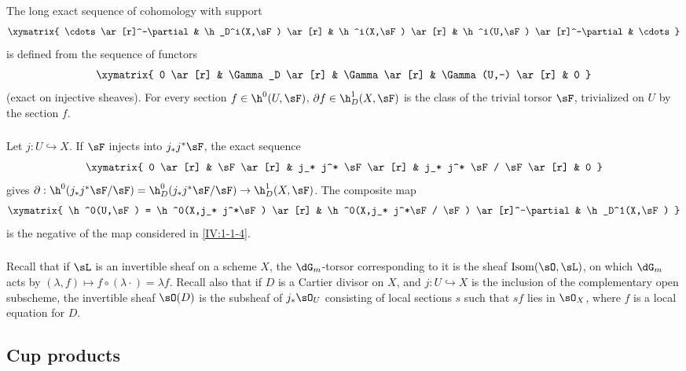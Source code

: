\documentclass[oneside]{book}
\begin{document}
The long exact sequence of cohomology with support
\[\xymatrix{
  \cdots \ar[r]^-\partial
    & \h_D^i(X,\sF) \ar[r]
    & \h^i(X,\sF) \ar[r]
    & \h^i(U,\sF) \ar[r]^-\partial
    & \cdots
}\]
is defined from the sequence of functors
\[\xymatrix{
  0 \ar[r]
    & \Gamma_D \ar[r]
    & \Gamma \ar[r]
    & \Gamma(U,-) \ar[r]
    & 0
}\]
(exact on injective sheaves). For every section $f\in \h^0(U,\sF)$,
$\partial f\in \h_D^1(X,\sF)$ is the class of the trivial torsor $\sF$,
trivialized on $U$ by the section $f$.






\subsubsection{}\label{IV:1-1-5}

Let $j:U\hookrightarrow X$. If $\sF$ injects into $j_* j^* \sF$, the exact
sequence
\[\xymatrix{
  0 \ar[r]
  & \sF \ar[r]
  & j_* j^* \sF \ar[r]
  & j_* j^* \sF / \sF \ar[r]
  & 0
}\]
gives
$\partial:\h^0(j_* j^*\sF/\sF) = \h_D^0(j_* j^* \sF/\sF) \to \h_D^1(X,\sF)$.
The composite map
\[\xymatrix{
  \h^0(U,\sF) = \h^0(X,j_* j^*\sF) \ar[r]
    & \h^0(X,j_* j^*\sF / \sF) \ar[r]^-\partial
    & \h_D^1(X,\sF)
}\]
is the negative of the map considered in \ref{IV:1-1-4}.






\subsubsection{}\label{IV:1-1-6}

Recall that if $\sL$ is an invertible sheaf on a scheme $X$, the
$\dG_m$-torsor corresponding to it is the sheaf
$\operatorname{Isom}(\sO,\sL)$, on which $\dG_m$ acts by
$(\lambda,f)\mapsto f\circ (\lambda\cdot) = \lambda f$. Recall also that if
$D$ is a Cartier divisor on $X$, and $j:U\hookrightarrow X$ is the inclusion
of the complementary open subscheme, the invertible sheaf $\sO(D)$ is the
subsheaf of $j_*\sO_U$ consisting of local sections $s$ such that $s f$ lies
in $\sO_X$, where $f$ is a local equation for $D$.











\subsection{Cup products}\label{IV:1-2}
\end{document}
